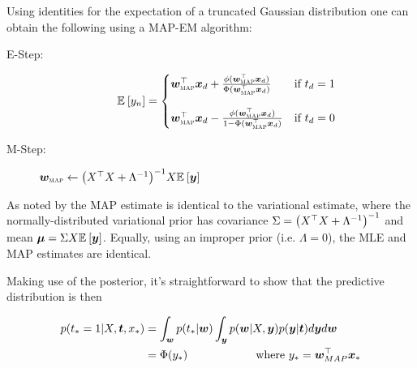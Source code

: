 Using identities for the expectation of a truncated Gaussian distribution one can obtain the following using a MAP-EM algorithm\cite{Figueiredo2003}\cite{Armagan2011}:

\begin{description}
    \item[E-Step:]  \begin{equation*}
            \ex{y_n}{} = \left\{ \begin{matrix*}[l]
                \wmap\T\vv{x}_d + \frac{\phi(\wmap\T\vv{x}_d)}{\Phi(\wmap\T\vv{x}_d)} & \text{if } t_d = 1 \\
                \quad & \quad \\
                \wmap\T\vv{x}_d - \frac{\phi(\wmap\T\vv{x}_d)}{1 - \Phi(\wmap\T\vv{x}_d)} & \text{if } t_d = 0 
            \end{matrix*} \right.
        \end{equation*}
    \item[M-Step:] $\bm w_{\text{\tiny \sc MAP}} \leftarrow {\left( X ^\top X + \Lambda^{-1} \right)}^{-1}X\mathbb{E}_{ {  } }\left[ \bm y \right]$
\end{description}
As noted by \cite{Armagan2011} the MAP estimate is identical to the variational estimate, where the normally-distributed variational prior has covariance $\Sigma = {\left( X^\top X + \Lambda^{-1} \right)}^{-1}$ and mean $\bm \mu = \Sigma X \mathbb{E}_{ {  } }\left[ \bm y \right]$. Equally, using an improper prior (i.e. $\Lambda = 0$), the MLE and MAP estimates are identical.

Making use of the posterior, it's straightforward to show that the predictive distribution is then

\begin{align}
p(t_* = 1| X, \bm t, x_*) & = \int_{\bm w} p(t_* | \bm w)\int_{\bm y} p(\bm w| X, \bm y)p(\bm y|\bm t) d\bm y d\bm w \\
& = \Phi(y_*) \qquad \qquad \qquad \text{where }y_* = \bm w_{MAP}^\top\bm x_*
\end{align}

%
%

